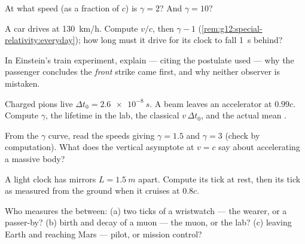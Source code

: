 \begin{exercise}[$\star$]\label{exo:g12:special-relativity:3}
At what speed (as a fraction of $c$) is $\gamma = 2$? And $\gamma = 10$?
\end{exercise}

\begin{exercise}[$\star$]\label{exo:g12:special-relativity:4}
A car drives at \qty{130}{km/h}. Compute $v/c$, then $\gamma - 1$
(\cref{rem:g12:special-relativity:everyday}); how long must it drive for
its clock to fall \qty{1}{s} behind?
\end{exercise}

\begin{exercise}[$\star$]\label{exo:g12:special-relativity:5}
In Einstein's train experiment, explain --- citing the postulate used ---
why the passenger concludes the \emph{front} strike came first, and why
neither observer is mistaken.
\end{exercise}

\begin{exercise}[$\star\star$]\label{exo:g12:special-relativity:6}
Charged pions live $\Delta t_0 = \qty{2.6e-8}{s}$. A beam leaves an
accelerator at $0.99c$. Compute $\gamma$, the lifetime in the lab, the
classical  $v\,\Delta t_0$, and the actual mean .
\end{exercise}

\begin{exercise}[$\star\star$]\label{exo:g12:special-relativity:7}
From the $\gamma$ curve, read the speeds giving $\gamma = 1.5$ and
$\gamma = 3$ (check by computation). What does the vertical asymptote at
$v = c$ say about accelerating a massive body?
\end{exercise}

\begin{exercise}[$\star\star$]\label{exo:g12:special-relativity:8}
A light clock has mirrors $L = \qty{1.5}{m}$ apart. Compute its tick at
rest, then its tick as measured from the ground when it cruises at $0.8c$.
\end{exercise}

\begin{exercise}[$\star\star$]\label{exo:g12:special-relativity:9}
Who measures the  between: (a) two ticks of a wristwatch --- the
wearer, or a passer-by? (b) birth and decay of a muon --- the muon, or the
lab? (c) leaving Earth and reaching Mars --- pilot, or mission control?
\end{exercise}

